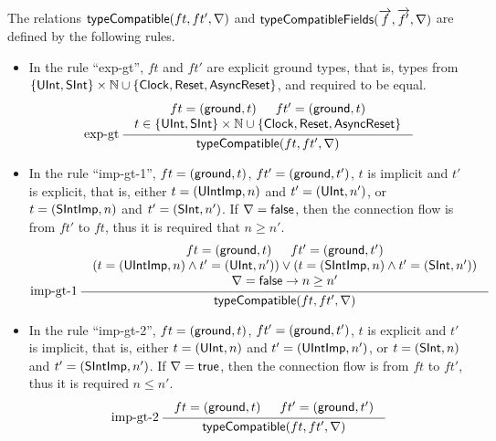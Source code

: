 The relations ${\sf typeCompatible}(ft, ft', \nabla)$ and  ${\sf typeCompatibleFields}(\overrightarrow{f}, \overrightarrow{f'}, \nabla)$ are defined by the following rules. 
\begin{itemize}
	\item In the rule ``exp-gt'', $ft$ and $ft'$ are explicit ground types, that is, types from $\{{\sf UInt}, {\sf SInt}\} \times \mathbb{N} \cup \{{\sf Clock}, {\sf Reset}, {\sf AsyncReset}\}$, and required to be equal. 
	\begin{gather*}
		\infer[exp-gt]
		{\typecompatible(ft, ft', \flipped)}
		{
			\begin{array}{c}
				ft = (\gtype, t) \hspace{15pt} ft' = (\gtype, t) \\
				t \in \{\uint, \sint\} \times \Nat \cup \{\clock, \reset, \asyncreset\}
			\end{array}
		}
	\end{gather*}
	\item In the rule ``imp-gt-1'',  $ft = ({\sf ground}, t)$, $ft' = ({\sf ground}, t')$, $t$ is implicit and $t'$ is explicit, that is, either $t= ({\sf UIntImp}, n)$ and $t' = ({\sf UInt}, n')$, or $t= ({\sf SIntImp}, n)$ and $t' = ({\sf SInt}, n')$.  If $\nabla = {\sf false}$, then the connection flow is from $ft'$ to $ft$, thus it is required that $n \ge n'$. 
	\begin{gather*}
		\infer[imp-gt-1]
		{\typecompatible(ft, ft', \flipped)}
		{
			\begin{array}{c}
				ft = (\gtype, t) \hspace{15pt} ft' = (\gtype, t') \\
				(t = (\uintimp, n) \wedge t' = (\uint, n')) \vee (t = (\sintimp, n) \wedge t' = (\sint, n')) \\
				\flipped = \lfalse \rightarrow n \ge n'
			\end{array}
		}	
	\end{gather*}	
	\item In the rule ``imp-gt-2'',  $ft = ({\sf ground}, t)$, $ft' = ({\sf ground}, t')$, $t$ is explicit and $t'$ is implicit, that is, either $t= ({\sf UInt}, n)$ and $t' = ({\sf UIntImp}, n')$, or $t= ({\sf SInt}, n)$ and $t' = ({\sf SIntImp}, n')$.  If $\nabla = {\sf true}$, then the connection flow is from $ft$ to $ft'$, thus it is required $n \le n'$. 
	\begin{gather*}
		\infer[imp-gt-2]
		{\typecompatible(ft, ft', \flipped)}
		{
			\begin{array}{c}
				ft = (\gtype, t) \hspace{15pt} ft' = (\gtype, t') \\

\end{array}}
\end{gather*}
\end{itemize}
